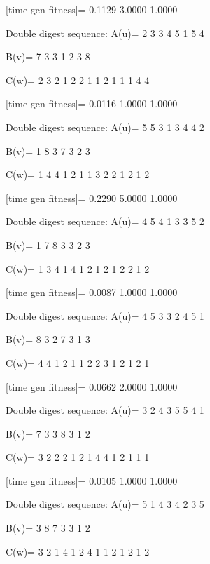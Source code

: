 [time gen fitness]=
    0.1129    3.0000    1.0000

Double digest sequence:
A(u)=
     2     3     3     4     5     1     5     4

B(v)=
     7     3     3     1     2     3     8

C(w)=
     2     3     2     1     2     2     1     1     2     1     1     1     4     4

[time gen fitness]=
    0.0116    1.0000    1.0000

Double digest sequence:
A(u)=
     5     5     3     1     3     4     4     2

B(v)=
     1     8     3     7     3     2     3

C(w)=
     1     4     4     1     2     1     1     3     2     2     1     2     1     2

[time gen fitness]=
    0.2290    5.0000    1.0000

Double digest sequence:
A(u)=
     4     5     4     1     3     3     5     2

B(v)=
     1     7     8     3     3     2     3

C(w)=
     1     3     4     1     4     1     2     1     2     1     2     2     1     2

[time gen fitness]=
    0.0087    1.0000    1.0000

Double digest sequence:
A(u)=
     4     5     3     3     2     4     5     1

B(v)=
     8     3     2     7     3     1     3

C(w)=
     4     4     1     2     1     1     2     2     3     1     2     1     2     1

[time gen fitness]=
    0.0662    2.0000    1.0000

Double digest sequence:
A(u)=
     3     2     4     3     5     5     4     1

B(v)=
     7     3     3     8     3     1     2

C(w)=
     3     2     2     2     1     2     1     4     4     1     2     1     1     1

[time gen fitness]=
    0.0105    1.0000    1.0000

Double digest sequence:
A(u)=
     5     1     4     3     4     2     3     5

B(v)=
     3     8     7     3     3     1     2

C(w)=
     3     2     1     4     1     2     4     1     1     2     1     2     1     2

